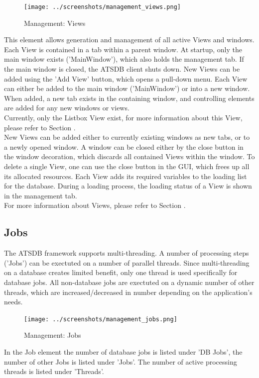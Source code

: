 \begin{figure}[H]
  \center
    \texttt{[image: ../screenshots/management\_views.png]}
  \caption{Management: Views}
  \label{fig:management_views}
\end{figure}

This element allows generation and management of all active Views and windows. Each View is contained
in a tab within a parent window.  At startup, only the main window exists ('MainWindow'), which also holds
the management tab. If the main window is closed, the ATSDB client shuts down. New Views can be added using the 'Add View' button, which opens a pull-down menu. Each View can either be added to the main window ('MainWindow') or into a new window. When added, a new tab exists in the containing window, and controlling elements are added for any new
windows or views. \\

Currently, only the Listbox View exist, for more information about this View, please refer to Section .\\

New Views can be added either to currently existing windows as new tabs, or to a newly opened window. A window can be closed either by the close button in the window decoration, which discards all contained Views within the window.  To delete a single View, one can use the close button in the GUI, which frees up all its allocated resources. Each View adds its required variables to the loading list for the database.  During a loading process, the loading status  of a View is shown in the management tab.\\

For more information about Views, please refer to Section .

\subsection{Jobs}

The ATSDB framework supports multi-threading. A number of processing steps ('Jobs') can be exectuted on a number of parallel threads. Since multi-threading on a database creates limited benefit, only one thread is used specifically for database jobs. All non-database jobs are exectuted on a dynamic number of other threads, which are increased/decreased in number depending on the application's needs. 

\begin{figure}[H]
  \center
    \texttt{[image: ../screenshots/management\_jobs.png]}
  \caption{Management: Jobs}
  \label{fig:management_jobs}
\end{figure}

In the Job element the number of database jobs is listed under 'DB Jobs', the number of other Jobs is listed under 'Jobs'. The number of active processing threads is listed under 'Threads'.
 

